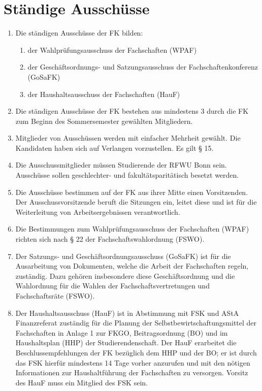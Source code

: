 \documentclass{article}
\begin{document}
\section{Ständige Ausschüsse}
\begin{enumerate}[(1)]
    \item Die ständigen Ausschüsse der FK bilden:
    \begin{enumerate}
        \item der Wahlprüfungsausschuss der Fachschaften (WPAF)
        \item der Geschäftsordnungs- und Satzungsausschuss der Fachschaftenkonferenz (GoSaFK)
        \item der Haushaltsausschuss der Fachschaften (HauF)
    \end{enumerate}
    \item Die ständigen Ausschüsse der FK bestehen aus mindestens 3 durch die FK zum Beginn des Sommersemester gewählten Mitgliedern.
    \item Mitglieder von Ausschüssen werden mit einfacher Mehrheit gewählt. 
    	Die Kandidaten haben sich auf Verlangen vorzustellen. Es gilt § 15.
    \item Die Ausschussmitglieder müssen Studierende der RFWU Bonn sein. 
    	Ausschüsse sollen geschlechter- und fakultätsparitätisch besetzt werden.
    \item Die Ausschüsse bestimmen auf der FK aus ihrer Mitte einen Vorsitzenden. 
    	Der Ausschussvorsitzende beruft die Sitzungen ein, leitet diese und ist für die Weiterleitung von Arbeitsergebnissen verantwortlich.
    \item Die Bestimmungen zum Wahlprüfungsausschuss der Fachschaften (WPAF) richten sich nach § 22 der Fachschaftswahlordnung (FSWO).
    \item Der Satzungs- und Geschäftsordnungsausschuss (GoSaFK) ist für die Ausarbeitung von Dokumenten, welche die Arbeit der Fachschaften regeln, zuständig. 
    	Dazu gehören insbesondere diese Geschäftsordnung und die Wahlordnung für die Wahlen der Fachschaftsvertretungen und Fachschaftsräte (FSWO). 
    \item Der Haushaltsausschuss (HauF) ist in Abstimmung mit FSK und AStA Finanzreferat zuständig für die Planung der Selbstbewirtschaftungsmittel der Fachschaften in Anlage 1 zur FKGO, Beitragsordnung (BO) und im Haushaltsplan (HHP) der Studierendenschaft. 
    	Der HauF erarbeitet die Beschlussempfehlungen der FK bezüglich dem HHP und der BO; er ist durch das FSK hierfür mindestens 14 Tage vorher anzurufen und mit den nötigen Informationen zur Haushaltführung der Fachschaften zu versorgen. 
    	Vorsitz des HauF muss ein Mitglied des FSK sein.
\end{enumerate}
\end{document}
